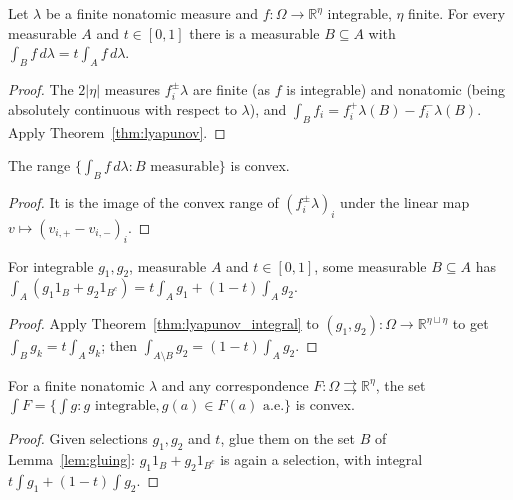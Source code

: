 \begin{theorem}
\label{thm:lyapunov_integral}
\leanok
{}
Let $\lambda$ be a finite nonatomic measure and $f\colon \Omega \to \mathbb{R}^\eta$ integrable, $\eta$ finite. For every
measurable $A$ and $t \in [0,1]$ there is a measurable $B \subseteq A$ with $\int_B f\,d\lambda = t \int_A f\,d\lambda$.
\end{theorem}
\begin{proof}
\leanok
The $2|\eta|$ measures $f_i^{\pm}\lambda$ are finite (as $f$ is integrable) and nonatomic (being absolutely continuous
with respect to $\lambda$), and $\int_B f_i = f_i^+\lambda(B) - f_i^-\lambda(B)$. Apply Theorem~\ref{thm:lyapunov}.
\end{proof}

\begin{corollary}
\label{cor:convex_integral_range}
\leanok
{}
The range $\{\int_B f\,d\lambda : B \text{ measurable}\}$ is convex.
\end{corollary}
\begin{proof}
\leanok
It is the image of the convex range of $(f_i^{\pm}\lambda)_{i}$ under the linear map $v \mapsto (v_{i,+} - v_{i,-})_i$.
\end{proof}

\begin{lemma}[Gluing]
\label{lem:gluing}
\leanok
{}
For integrable $g_1, g_2$, measurable $A$ and $t \in [0,1]$, some measurable $B \subseteq A$ has
$\int_A (g_1 1_B + g_2 1_{B^c}) = t \int_A g_1 + (1-t)\int_A g_2$.
\end{lemma}
\begin{proof}
\leanok
Apply Theorem~\ref{thm:lyapunov_integral} to $(g_1, g_2)\colon \Omega \to \mathbb{R}^{\eta \sqcup \eta}$ to get
$\int_B g_k = t \int_A g_k$; then $\int_{A \setminus B} g_2 = (1-t)\int_A g_2$.
\end{proof}

\begin{theorem}
\label{thm:convex_selection_integral}
\leanok
{}
For a finite nonatomic $\lambda$ and any correspondence $F\colon \Omega \rightrightarrows \mathbb{R}^\eta$, the set
$\int F = \{\int g : g \text{ integrable}, g(a) \in F(a) \text{ a.e.}\}$ is convex.
\end{theorem}
\begin{proof}
\leanok
Given selections $g_1, g_2$ and $t$, glue them on the set $B$ of Lemma~\ref{lem:gluing}: $g_1 1_B + g_2 1_{B^c}$ is again
a selection, with integral $t\int g_1 + (1-t)\int g_2$.
\end{proof}

